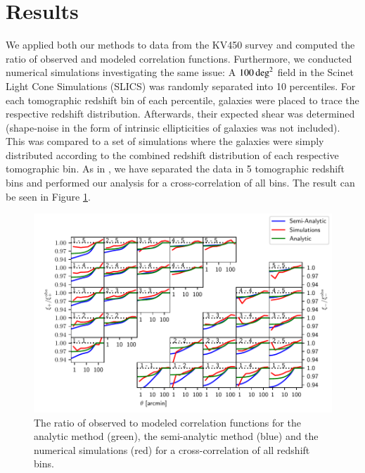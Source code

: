\section{Results}
\label{sec:results}
We applied both our methods to data from the KV450 survey and computed the ratio of observed and modeled correlation functions. Furthermore, we conducted numerical simulations investigating the same issue: A $100\,\rm{deg}^2$ field in the Scinet Light Cone Simulations (SLICS) \citep{2018MNRAS.481.1337H} was randomly separated into 10 percentiles. For each tomographic redshift bin of each percentile, galaxies were placed to trace the respective redshift distribution. Afterwards, their expected shear was determined (shape-noise in the form of intrinsic ellipticities of galaxies was not included). This was compared to a set of simulations where the galaxies were simply distributed according to the combined redshift distribution of each respective tomographic bin. As in \citet{2018arXiv181206076H}, we have separated the data in 5 tomographic redshift bins and performed our analysis for a cross-correlation of all bins. The result can be seen in Figure \ref{fig:all_xis}.
	\begin{figure}
	\centering
	\includegraphics[width=1\textwidth]{images/allxis_0111.pdf}
	\caption{The ratio of observed to modeled correlation functions for the analytic method (green), the semi-analytic method (blue) and the numerical simulations (red) for a cross-correlation of all redshift bins.}
	\label{fig:all_xis}
	\end{figure}
